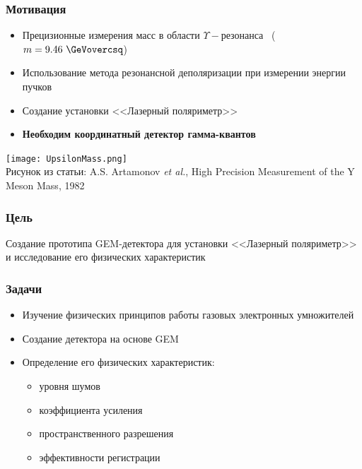 \documentclass[14pt]{beamer}
\begin{document}
\begin{frame}
	\frametitle{Мотивация}
	\begin{minipage}[h]{0.55\linewidth}
	\small{
	\begin{itemize}
		\item Прецизионные измерения масс в области $\Upsilon-\text{резонанса}$
		~($m = 9.46~\GeVovercsq$) 
		\item Использование метода резонансной деполяризации при измерении энергии пучков
		\item Создание установки <<Лазерный поляриметр>>
		\item \textbf{Необходим координатный детектор гамма-квантов}
	\end{itemize}}
	\hfill
	\end{minipage}
		\begin{minipage}[h]{0.43\linewidth}
			\texttt{[image: UpsilonMass.png]}
			\\\tiny{Рисунок из статьи: A.S. Artamonov \emph{et al.}, High Precision Measurement of the Y Meson Mass, 1982}
		\end{minipage}
	\end{frame}

\begin{frame}
\frametitle{Цель}
Создание прототипа GEM-детектора для установки <<Лазерный поляриметр>> и исследование его физических характеристик
\end{frame}

\begin{frame}[t]
\frametitle{Задачи}
	\begin{itemize}
		\item Изучение физических принципов работы газовых электронных умножителей
		\item Создание детектора на основе GEM 
		\item Определение его физических характеристик:
		\begin{itemize}
			\item уровня шумов
			\item коэффициента усиления
			\item пространственного разрешения
			\item эффективности регистрации
		\end{itemize}
	\end{itemize}
\end{frame}
\end{document}
